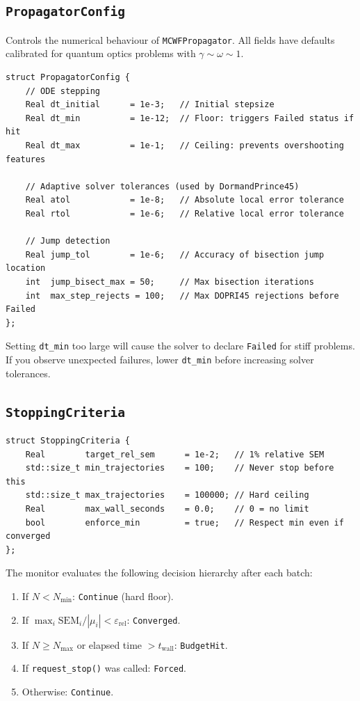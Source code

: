 \documentclass[11pt,a4paper,twoside]{book}
\newcommand{\code}[1]{\texttt{\small#1}}
\theoremstyle{definition}
\theoremstyle{remark}
\begin{document}
\subsection{\texttt{PropagatorConfig}}
\label{subsec:propagator-config}

Controls the numerical behaviour of \code{MCWFPropagator}.
All fields have defaults calibrated for quantum optics
problems with $\gamma \sim \omega \sim 1$.

\begin{verbatim}
struct PropagatorConfig {
    // ODE stepping
    Real dt_initial      = 1e-3;   // Initial stepsize
    Real dt_min          = 1e-12;  // Floor: triggers Failed status if hit
    Real dt_max          = 1e-1;   // Ceiling: prevents overshooting features

    // Adaptive solver tolerances (used by DormandPrince45)
    Real atol            = 1e-8;   // Absolute local error tolerance
    Real rtol            = 1e-6;   // Relative local error tolerance

    // Jump detection
    Real jump_tol        = 1e-6;   // Accuracy of bisection jump location
    int  jump_bisect_max = 50;     // Max bisection iterations
    int  max_step_rejects = 100;   // Max DOPRI45 rejections before Failed
};
\end{verbatim}

\begin{warnbox}
  Setting \code{dt\_min} too large will cause the solver to declare
  \code{Failed} for stiff problems. If you observe unexpected failures,
  lower \code{dt\_min} before increasing solver tolerances.
\end{warnbox}

\subsection{\texttt{StoppingCriteria}}
\label{subsec:stopping-criteria}

\begin{verbatim}
struct StoppingCriteria {
    Real        target_rel_sem      = 1e-2;   // 1% relative SEM
    std::size_t min_trajectories    = 100;    // Never stop before this
    std::size_t max_trajectories    = 100000; // Hard ceiling
    Real        max_wall_seconds    = 0.0;    // 0 = no limit
    bool        enforce_min         = true;   // Respect min even if converged
};
\end{verbatim}

The monitor evaluates the following decision hierarchy after each batch:
\begin{enumerate}
  \item If $N < N_{\min}$: \code{Continue} (hard floor).
  \item If $\max_i \mathrm{SEM}_i / |\mu_i| < \varepsilon_{\mathrm{rel}}$:
        \code{Converged}.
  \item If $N \geq N_{\max}$ or elapsed time $> t_{\mathrm{wall}}$:
        \code{BudgetHit}.
  \item If \code{request\_stop()} was called: \code{Forced}.
  \item Otherwise: \code{Continue}.
\end{enumerate}
\end{document}
